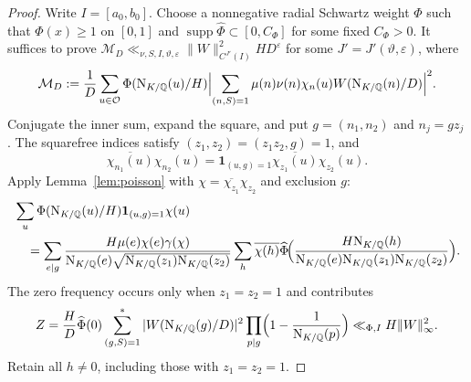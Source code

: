 \documentclass[11pt,a4paper]{article}
\numberwithin{equation}{section}
\numberwithin{figure}{section}
\theoremstyle{definition}
\theoremstyle{remark}
\newcommand{\Q}{\mathbb Q}
\newcommand{\NK}{\mathrm N_{K/\Q}}
\newcommand{\OO}{\mathcal O}
\newcommand{\ind}{\mathbf1}
\begin{document}
\begin{proof}
Write $I=[a_0,b_0]$. Choose a nonnegative radial Schwartz weight
$\Phi$ such that $\Phi(x)\ge1$ on $[0,1]$ and
$\operatorname{supp}\widehat\Phi\subset[0,C_\Phi]$ for some fixed $C_\Phi>0$.
It suffices to prove
$\mathcal M_D\ll_{\nu,S,I,\vartheta,\varepsilon}
\|W\|_{C^{J'}(I)}^2HD^\varepsilon$ for some $J'=J'(\vartheta,\varepsilon)$, where
\begin{equation}\label{eq:expanded-ms}
 \mathcal M_D:=\frac1D\sum_{u\in\OO}\Phi(\NK(u)/H)
 \Bigl|\sum_{(n,S)=1}\mu(n)\nu(n)\chi_n(u)W(\NK(n)/D)\Bigr|^2.
\end{equation}
Conjugate the inner sum, expand the square, and put
$g=(n_1,n_2)$ and $n_j=gz_j$. The squarefree indices satisfy
$(z_1,z_2)=(z_1z_2,g)=1$, and
\[
 \overline{\chi_{n_1}(u)}\chi_{n_2}(u)
 =\ind_{(u,g)=1}\overline{\chi_{z_1}(u)}\chi_{z_2}(u).
\]
Apply Lemma~\ref{lem:poisson} with
$\chi=\overline{\chi_{z_1}}\chi_{z_2}$ and exclusion $g$:
\begin{equation}\label{eq:initial-poisson-rows}
 \begin{aligned}
 &\sum_u\Phi(\NK(u)/H)\ind_{(u,g)=1}\chi(u)\\
 &\quad=\sum_{e\mid g}
 \frac{H\mu(e)\chi(e)\gamma(\chi)}
      {\NK(e)\sqrt{\NK(z_1)\NK(z_2)}}
 \sum_h\overline{\chi(h)}
 \widehat\Phi\!\Bigl(\frac{H\NK(h)}{\NK(e)\NK(z_1)\NK(z_2)}\Bigr).
 \end{aligned}
\end{equation}
The zero frequency occurs only when $z_1=z_2=1$ and contributes
\[
 Z=\frac HD\widehat\Phi(0)
 \sum_{(g,S)=1}^*|W(\NK(g)/D)|^2
       \prod_{p\mid g}\Bigl(1-\frac1{\NK(p)}\Bigr)
 \ll_{\Phi,I}H\|W\|_\infty^2.
\]
Retain all $h\ne0$, including those with $z_1=z_2=1$.


\end{proof}
\end{document}
